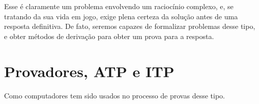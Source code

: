 Esse é claramente um problema envolvendo um raciocínio complexo, e, se tratando da sua vida em jogo, exige plena certeza da solução antes de uma resposta definitiva. De fato, seremos capazes de formalizar problemas desse tipo, e obter métodos de derivação para obter um prova para a resposta.

\section{Provadores, ATP e ITP}
Como computadores tem sido usados no processo de provas desse tipo.
